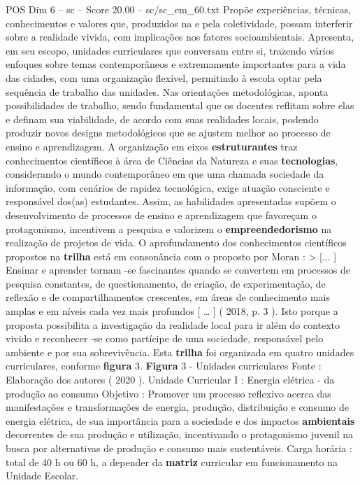 \begin{textsample}{POS Dim 6 – sc – Score 20.00 – sc/sc\_em\_60.txt}
Propõe experiências, técnicas, conhecimentos e valores que, produzidos na e pela coletividade, possam interferir sobre a realidade vivida, com implicações nos fatores socioambientais.
Apresenta, em seu escopo, unidades curriculares que conversam entre si, trazendo vários enfoques sobre temas contemporâneos e extremamente importantes para a vida das cidades, com uma organização flexível, permitindo à escola optar pela sequência de trabalho das unidades.
Nas orientações metodológicas, aponta possibilidades de trabalho, sendo fundamental que os docentes reflitam sobre elas e definam sua viabilidade, de acordo com suas realidades locais, podendo produzir novos designs metodológicos que se ajustem melhor ao processo de ensino e aprendizagem.
A organização em eixos \textbf{estruturantes} traz conhecimentos científicos à área de Ciências da Natureza e suas \textbf{tecnologias}, considerando o mundo contemporâneo em que uma chamada sociedade da informação, com cenários de rapidez tecnológica, exige atuação consciente e responsável dos(as) estudantes.
Assim, as habilidades apresentadas supõem o desenvolvimento de processos de ensino e aprendizagem que favoreçam o protagonismo, incentivem a pesquisa e valorizem o \textbf{empreendedorismo} na realização de projetos de vida.
O aprofundamento dos conhecimentos científicos propostos na \textbf{trilha} está em consonância com o proposto por Moran : > [... ] Ensinar e aprender tornam -se fascinantes quando se convertem em processos de pesquisa constantes, de questionamento, de criação, de experimentação, de reflexão e de compartilhamentos crescentes, em áreas de conhecimento mais amplas e em níveis cada vez mais profundos [ … ] ( 2018, p. 3 ).
Isto porque a proposta possibilita a investigação da realidade local para ir além do contexto vivido e reconhecer -se como partícipe de uma sociedade, responsável pelo ambiente e por sua sobrevivência.
Esta \textbf{trilha} foi organizada em quatro unidades curriculares, conforme \textbf{figura} 3. \textbf{Figura} 3 - Unidades curriculares Fonte : Elaboração dos autores ( 2020 ).
Unidade Curricular I : Energia elétrica - da produção ao consumo Objetivo : Promover um processo reflexivo acerca das manifestações e transformações de energia, produção, distribuição e consumo de energia elétrica, de sua importância para a sociedade e dos impactos \textbf{ambientais} decorrentes de sua produção e utilização, incentivando o protagonismo juvenil na busca por alternativas de produção e consumo mais sustentáveis.
Carga horária : total de 40 h ou 60 h, a depender da \textbf{matriz} curricular em funcionamento na Unidade Escolar.

\end{textsample}
